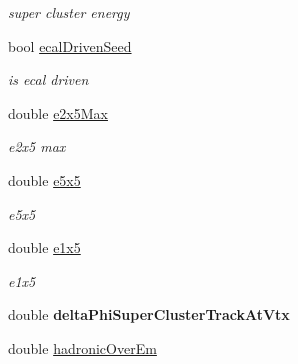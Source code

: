 \begin{DoxyCompactItemize}
\begin{DoxyCompactList}\small\item\em super cluster energy \end{DoxyCompactList}\item 
\hypertarget{classran_1_1ElectronStruct_a67aec0172a6f49670ff60621436da58b}{bool \hyperlink{classran_1_1ElectronStruct_a67aec0172a6f49670ff60621436da58b}{ecal\-Driven\-Seed}}\label{classran_1_1ElectronStruct_a67aec0172a6f49670ff60621436da58b}

\begin{DoxyCompactList}\small\item\em is ecal driven \end{DoxyCompactList}\item 
\hypertarget{classran_1_1ElectronStruct_a443b77544f6e958df3143b92cbc7f375}{double \hyperlink{classran_1_1ElectronStruct_a443b77544f6e958df3143b92cbc7f375}{e2x5\-Max}}\label{classran_1_1ElectronStruct_a443b77544f6e958df3143b92cbc7f375}

\begin{DoxyCompactList}\small\item\em e2x5 max \end{DoxyCompactList}\item 
\hypertarget{classran_1_1ElectronStruct_a550e3ae93aa6c792d3a95124098f7d36}{double \hyperlink{classran_1_1ElectronStruct_a550e3ae93aa6c792d3a95124098f7d36}{e5x5}}\label{classran_1_1ElectronStruct_a550e3ae93aa6c792d3a95124098f7d36}

\begin{DoxyCompactList}\small\item\em e5x5 \end{DoxyCompactList}\item 
\hypertarget{classran_1_1ElectronStruct_ad1f8f2b90dfa55301226469dc6b61d62}{double \hyperlink{classran_1_1ElectronStruct_ad1f8f2b90dfa55301226469dc6b61d62}{e1x5}}\label{classran_1_1ElectronStruct_ad1f8f2b90dfa55301226469dc6b61d62}

\begin{DoxyCompactList}\small\item\em e1x5 \end{DoxyCompactList}\item 
\hypertarget{classran_1_1ElectronStruct_a2d2124c3b49a224413876ad06111817e}{double {\bfseries delta\-Phi\-Super\-Cluster\-Track\-At\-Vtx}}\label{classran_1_1ElectronStruct_a2d2124c3b49a224413876ad06111817e}

\item 
\hypertarget{classran_1_1ElectronStruct_aae2e545a08694e0e38d37fc675cd0afd}{double \hyperlink{classran_1_1ElectronStruct_aae2e545a08694e0e38d37fc675cd0afd}{hadronic\-Over\-Em}}\label{classran_1_1ElectronStruct_aae2e545a08694e0e38d37fc675cd0afd}


\end{DoxyCompactItemize}
